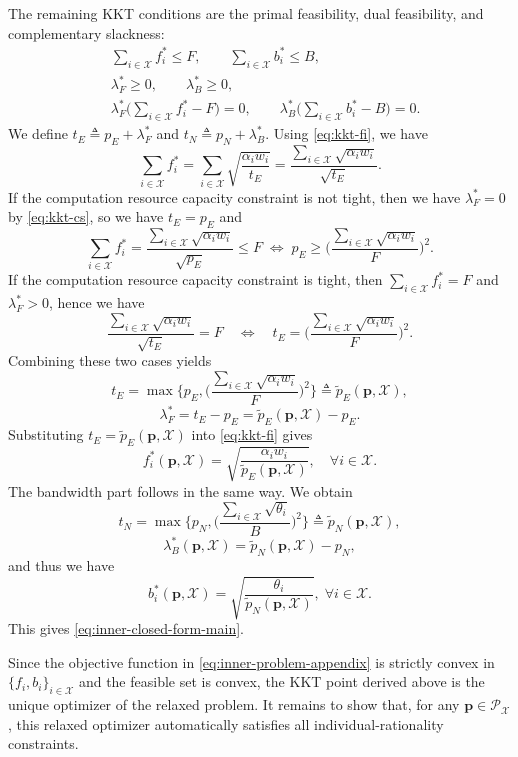 \documentclass[lettersize,journal]{IEEEtran}
\begin{document}
The remaining KKT conditions are the primal feasibility,
dual feasibility, and complementary slackness:
\begin{align}
&\sum_{i\in\mathcal{X}} f_i^* \le F,\qquad \sum_{i\in\mathcal{X}} b_i^* \le B, \label{eq:kkt-primal}\\
&\lambda_F^*\ge 0,\qquad \lambda_B^*\ge 0, \label{eq:kkt-dual}\\
&\lambda_F^*\Big(\sum_{i\in\mathcal{X}} f_i^*-F\Big)=0,\qquad
\lambda_B^*\Big(\sum_{i\in\mathcal{X}} b_i^*-B\Big)=0. \label{eq:kkt-cs}
\end{align}
We define 
\(
t_E \triangleq p_E+\lambda_F^*\) and \( t_N \triangleq p_N+\lambda_B^*.
\)
Using \eqref{eq:kkt-fi}, we have
\[
\sum_{i\in\mathcal{X}} f_i^*
=\sum_{i\in\mathcal{X}}\sqrt{\frac{\alpha_i w_i}{t_E}}
=\frac{\sum_{i\in\mathcal{X}}\sqrt{\alpha_i w_i}}{\sqrt{t_E}}.
\]
If the computation resource capacity constraint is not tight, then we have $\lambda_F^*=0$ by \eqref{eq:kkt-cs}, so we have $t_E=p_E$ and
\[
\sum_{i\in\mathcal{X}} f_i^*=\frac{\sum_{i\in\mathcal{X}}\sqrt{\alpha_i w_i}}{\sqrt{p_E}}\le F
\; \Longleftrightarrow\;
p_E \ge \Big(\frac{\sum_{i\in\mathcal{X}}\sqrt{\alpha_i w_i}}{F}\Big)^2.
\]
If the computation resource capacity constraint is tight, then $\sum_{i\in\mathcal{X}} f_i^*=F$ and $\lambda_F^*>0$, hence we have
\[
\frac{\sum_{i\in\mathcal{X}}\sqrt{\alpha_i w_i}}{\sqrt{t_E}}=F
\quad \Longleftrightarrow\quad
t_E=\Big(\frac{\sum_{i\in\mathcal{X}}\sqrt{\alpha_i w_i}}{F}\Big)^2.
\]
Combining these two cases yields
\[
t_E = \max\Big\{p_E,\Big(\frac{\sum_{i\in\mathcal{X}}\sqrt{\alpha_i w_i}}{F}\Big)^2\Big\}
\triangleq \tilde p_E(\boldsymbol{p},\mathcal{X}),
\]
\[
\lambda_F^* = t_E - p_E = \tilde p_E(\boldsymbol{p},\mathcal{X}) - p_E.
\]
Substituting $t_E=\tilde p_E(\boldsymbol{p},\mathcal{X})$ into \eqref{eq:kkt-fi} gives
\[
f_i^*(\boldsymbol{p},\mathcal{X})
=\sqrt{\frac{\alpha_i w_i}{\tilde p_E(\boldsymbol{p},\mathcal{X})}},
\quad \forall i\in\mathcal{X}.
\]
The bandwidth part follows in the same way. We obtain
\[
t_N
=\max\Big\{p_N,\Big(\frac{\sum_{i\in\mathcal{X}}\sqrt{\theta_i}}{B}\Big)^2\Big\}
\triangleq \tilde p_N(\boldsymbol{p},\mathcal{X}),
\]
\[
\lambda_B^*(\boldsymbol{p},\mathcal{X})=\tilde p_N(\boldsymbol{p},\mathcal{X})-p_N,
\]
and thus we have
\[
b_i^*(\boldsymbol{p},\mathcal{X})=\sqrt{\frac{\theta_i}{\tilde p_N(\boldsymbol{p},\mathcal{X})}},
\; \forall i\in\mathcal{X}.
\]
This gives \eqref{eq:inner-closed-form-main}.

Since the objective function in \eqref{eq:inner-problem-appendix} is strictly convex in
$\{f_i,b_i\}_{i\in\mathcal X}$ and the feasible set is convex, the KKT point derived above is the unique optimizer of the relaxed problem.
It remains to show that, for any $\boldsymbol p\in\mathcal P_{\mathcal X}$, this relaxed optimizer automatically satisfies all individual-rationality constraints.
\end{document}
